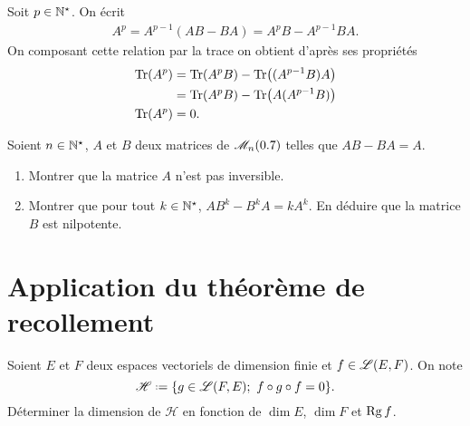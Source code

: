 
\begin{solution}
    Soit $p \in \mathbb{N}^\star$. On écrit
    \begin{align*}
        A^p = A^{p-1}(AB-BA) = A^pB - A^{p-1}BA.
    \end{align*}
    On composant cette relation par la trace on obtient d'après ses propriétés
    \begin{align*}
        \mathrm{Tr}(A^p) &= \mathrm{Tr}(A^pB) - \mathrm{Tr} \big((A^{p-1}B)A \big) \\
        &= \mathrm{Tr}(A^pB) - \mathrm{Tr} \big(A(A^{p-1}B) \big) \\
        \mathrm{Tr}(A^p) &= 0.
    \end{align*}
\end{solution}

\begin{exercice} 
    Soient $n \in \mathbb{N}^\star$, $A$ et $B$ deux matrices de $\mathscr{M}_n(0.7)$ telles que $AB - BA = A.$
    \begin{enumerate}
        \item Montrer que la matrice $A$ n'est pas inversible.
        \item Montrer que pour tout $k \in \mathbb{N}^\star$, $AB^k - B^k A = k A^k$. En déduire que la matrice $B$ est nilpotente. 
    \end{enumerate}
\end{exercice}

\section{Application du théorème de recollement}

\begin{exercice}
    Soient $E$ et $F$ deux espaces vectoriels de dimension finie et $f \in \mathscr{L}(E, F)$. On note 
    $$\mathscr{H} \defeq \{ g \in \Endo(F, E);\ f \circ g \circ f = 0\}.$$ 
    Déterminer la dimension de $\mathscr{H}$ en fonction de $\dim E$, $\dim F$ et $\mathrm{Rg}\, f$.
\end{exercice}


